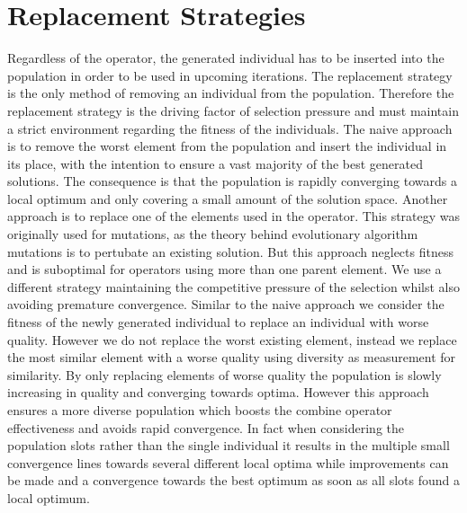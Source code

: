\documentclass[a4paper,12pt,titlepage, BCOR7mm,headsepline]{scrbook}
\numberwithin{equation}{section}
\begin{document}
\section{Replacement Strategies}
\label{sec:replacement}
Regardless of the operator, the generated individual has to be inserted into the population in order to be used in upcoming iterations. The replacement strategy is the only method of removing an individual from the population.
Therefore the replacement strategy is the driving factor of selection pressure and must maintain a strict environment regarding the fitness of the individuals. 
The naive approach is to remove the worst element from the population and insert the individual in its place, with the intention to ensure a vast majority of the best generated solutions.
The consequence is that the population is rapidly converging towards a local optimum and only covering a small amount of the solution space. Another approach is to replace one of the elements used in the operator. This strategy was originally used for mutations, as the theory behind evolutionary algorithm mutations is to pertubate an existing solution. But this approach neglects fitness and is suboptimal for operators using more than one parent element. 
We use a different strategy maintaining the competitive pressure of the selection whilst also avoiding premature convergence. Similar to the naive approach we consider the fitness of the newly generated individual to replace an individual with worse quality. However we do not replace the worst existing element, instead we replace the most similar element with a worse quality using diversity as measurement for similarity. By only replacing elements of worse quality the population is slowly increasing in quality and converging towards optima. However this approach ensures a more diverse population 
which boosts the combine operator effectiveness and avoids rapid convergence. In fact when considering the population slots rather than the single individual it results in the multiple small convergence lines towards several different local optima while improvements can be made and a convergence towards the best optimum as soon as all slots found a local optimum. 
\end{document}
